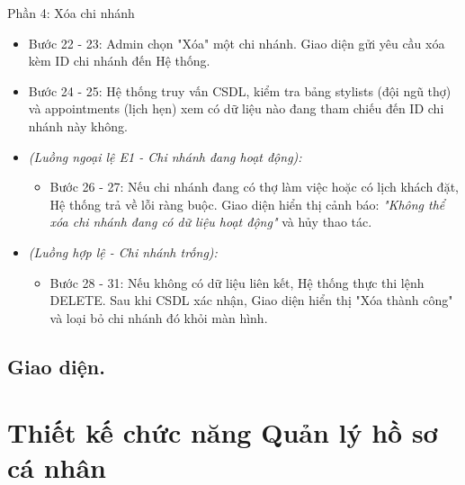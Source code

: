 \documentclass[../BTL.tex]{subfiles}
\begin{document}
Phần 4: Xóa chi nhánh

\begin{itemize}
\item
  Bước 22 - 23: Admin chọn "Xóa" một chi nhánh. Giao diện gửi yêu cầu
  xóa kèm ID chi nhánh đến Hệ thống.
\item
  Bước 24 - 25: Hệ thống truy vấn CSDL, kiểm tra bảng stylists (đội ngũ
  thợ) và appointments (lịch hẹn) xem có dữ liệu nào đang tham chiếu đến
  ID chi nhánh này không.
\item
  \emph{(Luồng ngoại lệ E1 - Chi nhánh đang hoạt động):}

  \begin{itemize}
  \item
    Bước 26 - 27: Nếu chi nhánh đang có thợ làm việc hoặc có lịch khách
    đặt, Hệ thống trả về lỗi ràng buộc. Giao diện hiển thị cảnh báo:
    \emph{"Không thể xóa chi nhánh đang có dữ liệu hoạt động"} và hủy
    thao tác.
  \end{itemize}
\item
  \emph{(Luồng hợp lệ - Chi nhánh trống):}

  \begin{itemize}
  \item
    Bước 28 - 31: Nếu không có dữ liệu liên kết, Hệ thống thực thi lệnh
    DELETE. Sau khi CSDL xác nhận, Giao diện hiển thị "Xóa thành công"
    và loại bỏ chi nhánh đó khỏi màn hình.
  \end{itemize}
\end{itemize}

\subsection{Giao diện.}

\section{Thiết kế chức năng Quản lý hồ sơ cá nhân}
\end{document}
